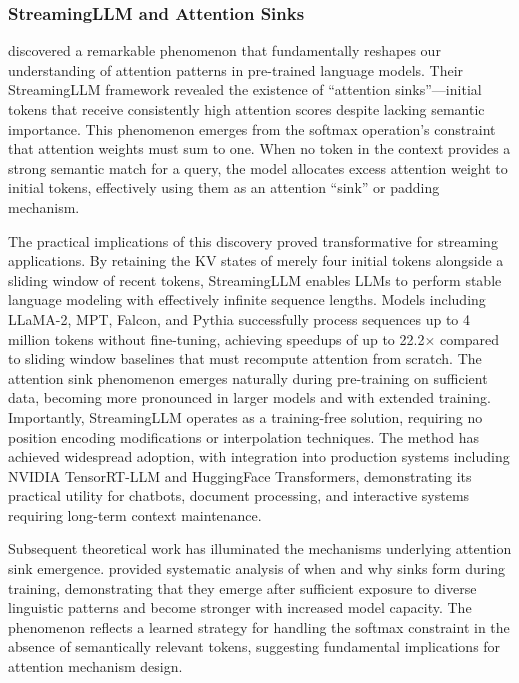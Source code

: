\documentclass[11pt,letterpaper]{article}
\begin{document}
\subsubsection{StreamingLLM and Attention Sinks}

\cite{xiao2024streamingllm} discovered a remarkable phenomenon that fundamentally reshapes our understanding of attention patterns in pre-trained language models. Their StreamingLLM framework revealed the existence of ``attention sinks''---initial tokens that receive consistently high attention scores despite lacking semantic importance. This phenomenon emerges from the softmax operation's constraint that attention weights must sum to one. When no token in the context provides a strong semantic match for a query, the model allocates excess attention weight to initial tokens, effectively using them as an attention ``sink'' or padding mechanism.

The practical implications of this discovery proved transformative for streaming applications. By retaining the KV states of merely four initial tokens alongside a sliding window of recent tokens, StreamingLLM enables LLMs to perform stable language modeling with effectively infinite sequence lengths. Models including LLaMA-2, MPT, Falcon, and Pythia successfully process sequences up to 4 million tokens without fine-tuning, achieving speedups of up to 22.2$\times$ compared to sliding window baselines that must recompute attention from scratch. The attention sink phenomenon emerges naturally during pre-training on sufficient data, becoming more pronounced in larger models and with extended training. Importantly, StreamingLLM operates as a training-free solution, requiring no position encoding modifications or interpolation techniques. The method has achieved widespread adoption, with integration into production systems including NVIDIA TensorRT-LLM and HuggingFace Transformers, demonstrating its practical utility for chatbots, document processing, and interactive systems requiring long-term context maintenance.

Subsequent theoretical work has illuminated the mechanisms underlying attention sink emergence. \cite{wu2025whenattentionsinkemerges} provided systematic analysis of when and why sinks form during training, demonstrating that they emerge after sufficient exposure to diverse linguistic patterns and become stronger with increased model capacity. The phenomenon reflects a learned strategy for handling the softmax constraint in the absence of semantically relevant tokens, suggesting fundamental implications for attention mechanism design.
\end{document}
